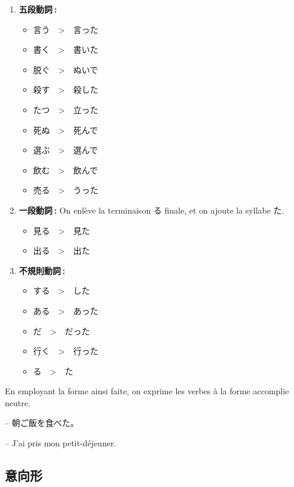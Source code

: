 \begin{enumerate}
    \item \textbf{五段動詞 :}
          \begin{itemize}
              \item 言う　>　言った
              \item 書く　>　書いた
              \item 脱ぐ　>　ぬいで
              \item 殺す　>　殺した
              \item たつ　>　立った
              \item 死ぬ　>　死んで
              \item 選ぶ　>　選んで
              \item 飲む　>　飲んで
              \item 売る　>　うった
          \end{itemize}
    \item \textbf{一段動詞 :} On enlève la terminaison る finale, et on ajoute la syllabe た.
          \begin{itemize}
              \item 見る　>　見た
              \item 出る　>　出た
          \end{itemize}
    \item \textbf{不規則動詞 :}
          \begin{itemize}
              \item する　>　した
              \item ある　>　あった
              \item だ　>　だった
              \item 行く　>　行った
              \item {}る　>　た
          \end{itemize}
\end{enumerate}

    En employant la forme ainsi faite, on exprime les verbes à la forme accomplie neutre.

    \begin{tcolorbox}
        -- 朝ご飯を食べた。

        -- J'ai pris mon petit-déjeuner.
    \end{tcolorbox}

    \subsection{意向形}

